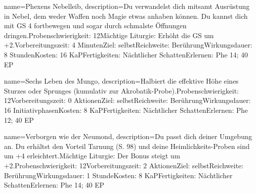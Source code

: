 {
    name={Phexens Nebelleib},
    description={Du verwandelst dich mitsamt Ausrüstung in Nebel, dem weder Waffen noch Magie etwas anhaben können. Du kannst dich mit GS 4 fortbewegen und sogar durch schmalste Öffnungen dringen.\newline Probenschwierigkeit: 12\newline Mächtige Liturgie: Erhöht die GS um +2.\newline Vorbereitungszeit: 4 Minuten\newline Ziel: selbst\newline Reichweite: Berührung\newline Wirkungsdauer: 8 Stunden\newline Kosten: 16 KaP\newline Fertigkeiten: Nächtlicher Schatten\newline Erlernen: Phe 14; 40 EP}
}


{
    name={Sechs Leben des Mungo},
    description={Halbiert die effektive Höhe eines Sturzes oder Sprunges (kumulativ zur Akrobatik-Probe).\newline Probenschwierigkeit: 12\newline Vorbereitungszeit: 0 Aktionen\newline Ziel: selbst\newline Reichweite: Berührung\newline Wirkungsdauer: 16 Initiativphasen\newline Kosten: 8 KaP\newline Fertigkeiten: Nächtlicher Schatten\newline Erlernen: Phe 12; 40 EP}
}


{
    name={Verborgen wie der Neumond},
    description={Du passt dich deiner Umgebung an. Du erhältst den Vorteil Tarnung (S. 98) und deine Heimlichkeits-Proben sind um +4 erleichtert.\newline Mächtige Liturgie: Der Bonus steigt um +2.\newline Probenschwierigkeit: 12\newline Vorbereitungszeit: 2 Aktionen\newline Ziel: selbst\newline Reichweite: Berührung\newline Wirkungsdauer: 1 Stunde\newline Kosten: 8 KaP\newline Fertigkeiten: Nächtlicher Schatten\newline Erlernen: Phe 14; 40 EP}
}


